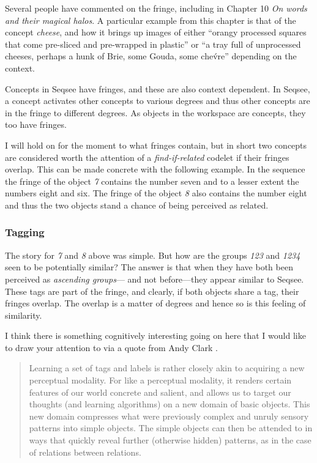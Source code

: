 \documentclass[letterpaper]{article}
\begin{document}
  Several people have commented on the fringe, including  in Chapter 10 \emph{On words and their magical halos}. A particular example from this chapter is that of the concept \emph{cheese}, and how it brings up images of either ``orangy processed squares that come pre-sliced and pre-wrapped in plastic'' or ``a tray full of unprocessed cheeses, perhaps a hunk of Brie, some Gouda, some che\'vre'' depending on the context.

Concepts in Seqsee have fringes, and these are also context dependent. In Seqsee, a concept activates other concepts to various degrees and thus other concepts are in the fringe to different degrees. As objects in the workspace are concepts, they too have fringes.

I will hold on for the moment to what fringes contain, but in short two concepts are considered worth the attention of a \emph{find-if-related} codelet if their fringes overlap.  This can be made concrete with the following example.  In the sequence  the fringe of the object \emph{7} contains the number seven and to a lesser extent the numbers eight and six.  The fringe of the object \emph{8} also contains the number eight and thus the two objects stand a chance of being perceived as related.

\subsubsection{Tagging}
\label{sec:tagging}

The story for \emph{7} and \emph{8} above was simple.  But how are the groups \emph{123} and \emph{1234} seen to be potentially similar?  The answer is that when they have both been perceived as \emph{ascending groups}--- and not before---they appear similar to Seqsee.  These tags are part of the fringe, and clearly, if both objects share a tag, their fringes overlap.  The overlap is a matter of degrees and hence so is this feeling of similarity.

I think there is something cognitively interesting going on here that I would like to draw your attention to via a quote from Andy Clark \cite{Clark:MindWare}.

\begin{quote}
Learning a set of tags and labels is rather closely akin to acquiring a new perceptual modality.  For like a perceptual modality, it renders certain features of our world concrete and salient, and allows us to target our thoughts (and learning algorithms) on a new domain of basic objects.  This new domain compresses what were previously complex and unruly sensory patterns into simple objects.  The simple objects can then be attended to in ways that quickly reveal further (otherwise hidden) patterns, as in the case of relations between relations.
\end{quote}
\end{document}

